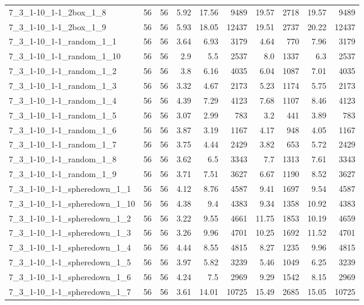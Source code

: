 \begin{center}
\begin{scriptsize}
\begin{longtable}{lrrrrrrrrr}
7\_3\_1-10\_1-1\_2box\_1\_8 & 56 & 56 & 5.92 & 17.56 & 9489 & 19.57 & 2718 & 19.57 & 9489\\
7\_3\_1-10\_1-1\_2box\_1\_9 & 56 & 56 & 5.93 & 18.05 & 12437 & 19.51 & 2737 & 20.22 & 12437\\
7\_3\_1-10\_1-1\_random\_1\_1 & 56 & 56 & 3.64 & 6.93 & 3179 & 4.64 & 770 & 7.96 & 3179\\
7\_3\_1-10\_1-1\_random\_1\_10 & 56 & 56 & 2.9 & 5.5 & 2537 & 8.0 & 1337 & 6.3 & 2537\\
7\_3\_1-10\_1-1\_random\_1\_2 & 56 & 56 & 3.8 & 6.16 & 4035 & 6.04 & 1087 & 7.01 & 4035\\
7\_3\_1-10\_1-1\_random\_1\_3 & 56 & 56 & 3.32 & 4.67 & 2173 & 5.23 & 1174 & 5.75 & 2173\\
7\_3\_1-10\_1-1\_random\_1\_4 & 56 & 56 & 4.39 & 7.29 & 4123 & 7.68 & 1107 & 8.46 & 4123\\
7\_3\_1-10\_1-1\_random\_1\_5 & 56 & 56 & 3.07 & 2.99 & 783 & 3.2 & 441 & 3.89 & 783\\
7\_3\_1-10\_1-1\_random\_1\_6 & 56 & 56 & 3.87 & 3.19 & 1167 & 4.17 & 948 & 4.05 & 1167\\
7\_3\_1-10\_1-1\_random\_1\_7 & 56 & 56 & 3.75 & 4.44 & 2429 & 3.82 & 653 & 5.72 & 2429\\
7\_3\_1-10\_1-1\_random\_1\_8 & 56 & 56 & 3.62 & 6.5 & 3343 & 7.7 & 1313 & 7.61 & 3343\\
7\_3\_1-10\_1-1\_random\_1\_9 & 56 & 56 & 3.71 & 7.51 & 3627 & 6.67 & 1190 & 8.52 & 3627\\
7\_3\_1-10\_1-1\_spheredown\_1\_1 & 56 & 56 & 4.12 & 8.76 & 4587 & 9.41 & 1697 & 9.54 & 4587\\
7\_3\_1-10\_1-1\_spheredown\_1\_10 & 56 & 56 & 4.38 & 9.4 & 4383 & 9.34 & 1358 & 10.92 & 4383\\
7\_3\_1-10\_1-1\_spheredown\_1\_2 & 56 & 56 & 3.22 & 9.55 & 4661 & 11.75 & 1853 & 10.19 & 4659\\
7\_3\_1-10\_1-1\_spheredown\_1\_3 & 56 & 56 & 3.26 & 9.96 & 4701 & 10.25 & 1692 & 11.52 & 4701\\
7\_3\_1-10\_1-1\_spheredown\_1\_4 & 56 & 56 & 4.44 & 8.55 & 4815 & 8.27 & 1235 & 9.96 & 4815\\
7\_3\_1-10\_1-1\_spheredown\_1\_5 & 56 & 56 & 3.97 & 5.82 & 3239 & 5.46 & 1049 & 6.25 & 3239\\
7\_3\_1-10\_1-1\_spheredown\_1\_6 & 56 & 56 & 4.24 & 7.5 & 2969 & 9.29 & 1542 & 8.15 & 2969\\
7\_3\_1-10\_1-1\_spheredown\_1\_7 & 56 & 56 & 3.61 & 14.01 & 10725 & 15.49 & 2685 & 15.05 & 10725\\

\end{longtable}
\end{scriptsize}
\end{center}
